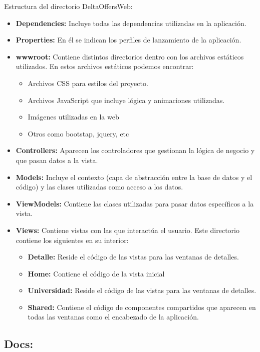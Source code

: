 Estructura del directorio DeltaOffersWeb:
\begin{itemize}
    \item \textbf{Dependencies:} Incluye todas las dependencias utilizadas en la aplicación.
    \item \textbf{Properties:} En él se indican los perfiles de lanzamiento de la aplicación.
    \item \textbf{wwwroot:} Contiene distintos directorios dentro con los archivos estáticos utilizados. En estos archivos estáticos podemos encontrar:
    \begin{itemize}
        \item Archivos CSS para estilos del proyecto.
        \item Archivos JavaScript que incluye lógica y animaciones utilizadas.
        \item Imágenes utilizadas en la web
        \item Otros como bootstap, jquery, etc
    \end{itemize}
    \item \textbf{Controllers:} Aparecen los controladores que gestionan la lógica de negocio y que pasan datos a la vista.
    \item \textbf{Models:} Incluye el contexto (capa de abstracción entre la base de datos y el código) y las clases utilizadas como acceso a los datos.
    \item \textbf{ViewModels:} Contiene las clases utilizadas para pasar datos específicos a la vista.
    \item \textbf{Views:} Contiene vistas con las que interactúa el usuario. Este directorio contiene los siguientes en su interior:
    \begin{itemize}
        \item \textbf{Detalle:} Reside el código de las vistas para las ventanas de detalles.
        \item \textbf{Home:} Contiene el código de la vista inicial
        \item \textbf{Universidad:} Reside el código de las vistas para las ventanas de detalles.
        \item \textbf{Shared:} Contiene el código de componentes compartidos que aparecen en todas las ventanas como el encabezado de la aplicación.
    \end{itemize}  
\end{itemize}

\subsection{Docs:}

